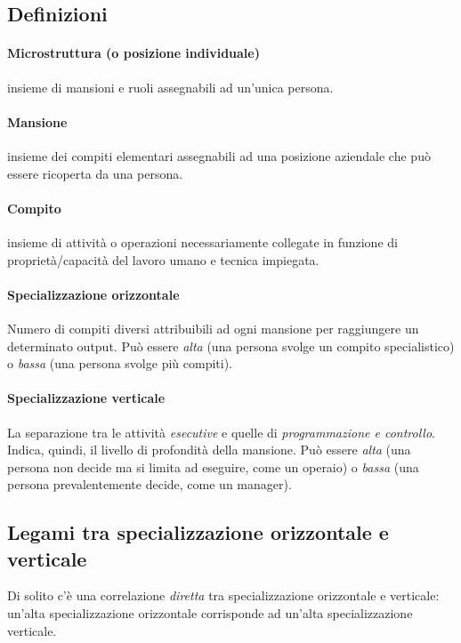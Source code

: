 \subsection{Definizioni}

\paragraph{Microstruttura (o posizione individuale)} insieme di mansioni e ruoli assegnabili ad un'unica persona.

\paragraph{Mansione} insieme dei compiti elementari assegnabili ad una
posizione aziendale che può essere ricoperta da una persona.

\paragraph{Compito} insieme di attività o operazioni necessariamente collegate
in funzione di proprietà/capacità del lavoro umano e
tecnica impiegata.

\paragraph{Specializzazione orizzontale}

Numero di compiti diversi attribuibili ad ogni mansione per
raggiungere un determinato output.
Può essere \emph{alta} (una persona svolge un compito specialistico) o \emph{bassa} (una persona svolge
più compiti).

\paragraph{Specializzazione verticale}
La separazione tra le attività \emph{esecutive} e quelle di
\emph{programmazione e controllo}.
Indica, quindi, il livello di profondità della mansione. Può essere \emph{alta} (una persona non decide
ma si limita ad eseguire, come un operaio) o \emph{bassa} (una persona
prevalentemente decide, come un manager).


\subsection{Legami tra specializzazione orizzontale e verticale}
Di solito c'è una correlazione \emph{diretta} tra specializzazione orizzontale e verticale:
un'alta specializzazione orizzontale
corrisponde ad un'alta specializzazione verticale.

